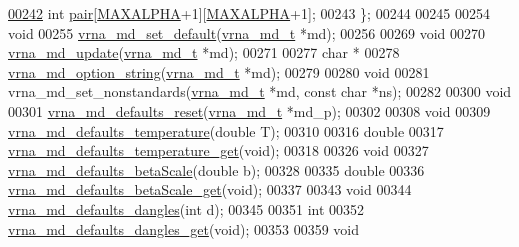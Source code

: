 \begin{DoxyCode}
\hypertarget{model_8h_source_l00242}{}\hyperlink{group__model__details_ab4da594c638707e212f64aadb54a7454}{00242}   \textcolor{keywordtype}{int}     \hyperlink{group__model__details_ab4da594c638707e212f64aadb54a7454}{pair}[\hyperlink{group__model__details_ga05a5ffe718aa431d97419a12fb082379}{MAXALPHA}+1][\hyperlink{group__model__details_ga05a5ffe718aa431d97419a12fb082379}{MAXALPHA}+1]; 
00243 \};
00244 
00245 
00254 \textcolor{keywordtype}{void}
00255 \hyperlink{group__model__details_ga8ac6ff84936282436f822644bf841f66}{vrna\_md\_set\_default}(\hyperlink{group__model__details_structvrna__md__s}{vrna\_md\_t} *md);
00256 
00269 \textcolor{keywordtype}{void}
00270 \hyperlink{group__model__details_ga36ae40b8c3b82362f5798ad5b047b814}{vrna\_md\_update}(\hyperlink{group__model__details_structvrna__md__s}{vrna\_md\_t} *md);
00271 
00277 \textcolor{keywordtype}{char} *
00278 \hyperlink{group__model__details_ga3a7469f0725a849af6ba61a57dfd60ce}{vrna\_md\_option\_string}(\hyperlink{group__model__details_structvrna__md__s}{vrna\_md\_t}  *md);
00279 
00280 \textcolor{keywordtype}{void}
00281 vrna\_md\_set\_nonstandards(\hyperlink{group__model__details_structvrna__md__s}{vrna\_md\_t} *md, \textcolor{keyword}{const} \textcolor{keywordtype}{char} *ns);
00282 
00300 \textcolor{keywordtype}{void}
00301 \hyperlink{group__model__details_ga70834424cf804d149937de89f80ceb45}{vrna\_md\_defaults\_reset}(\hyperlink{group__model__details_structvrna__md__s}{vrna\_md\_t} *md\_p);
00302 
00308 \textcolor{keywordtype}{void}
00309 \hyperlink{group__model__details_gaf9e527e9a2f7e6fd6e42bc6e602f5445}{vrna\_md\_defaults\_temperature}(\textcolor{keywordtype}{double} T);
00310 
00316 \textcolor{keywordtype}{double}
00317 \hyperlink{group__model__details_ga96b24a74437f9ba46c4e06343155bf46}{vrna\_md\_defaults\_temperature\_get}(\textcolor{keywordtype}{void});
00318 
00326 \textcolor{keywordtype}{void}
00327 \hyperlink{group__model__details_gae984567db36c3f9b8731ecc917abf3a2}{vrna\_md\_defaults\_betaScale}(\textcolor{keywordtype}{double} b);
00328 
00335 \textcolor{keywordtype}{double}
00336 \hyperlink{group__model__details_gabb8780f5410c52f970d75b044059bd09}{vrna\_md\_defaults\_betaScale\_get}(\textcolor{keywordtype}{void});
00337 
00343 \textcolor{keywordtype}{void}
00344 \hyperlink{group__model__details_gac76a5374def8e5e4e644ff6e4cc72dee}{vrna\_md\_defaults\_dangles}(\textcolor{keywordtype}{int} d);
00345 
00351 \textcolor{keywordtype}{int}
00352 \hyperlink{group__model__details_ga67ca06f95ae133778c79a4493c9817b8}{vrna\_md\_defaults\_dangles\_get}(\textcolor{keywordtype}{void});
00353 
00359 \textcolor{keywordtype}{void}

\end{DoxyCode}
